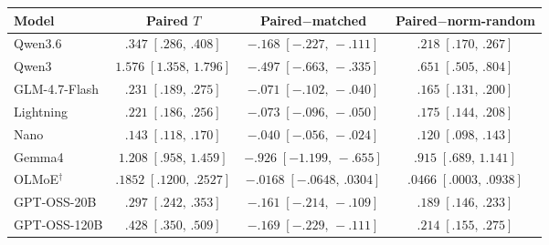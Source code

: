 \begingroup
\fontsize{9}{10.5}\selectfont
\setlength{\tabcolsep}{2.5pt}
\renewcommand{\arraystretch}{1.15}
\begin{tabular*}{\linewidth}{@{\extracolsep{\fill}}lccc@{}}
\toprule
Model & Paired \(T\) & Paired\(-\)matched & Paired\(-\)norm-random \\
\midrule
Qwen3.6 & \(.347\;[.286,\,.408]\) & \(-.168\;[-.227,\,-.111]\) & \(.218\;[.170,\,.267]\)\\[1pt]
Qwen3 & \(1.576\;[1.358,\,1.796]\) & \(-.497\;[-.663,\,-.335]\) & \(.651\;[.505,\,.804]\)\\[1pt]
GLM-4.7-Flash & \(.231\;[.189,\,.275]\) & \(-.071\;[-.102,\,-.040]\) & \(.165\;[.131,\,.200]\)\\[1pt]
Lightning & \(.221\;[.186,\,.256]\) & \(-.073\;[-.096,\,-.050]\) & \(.175\;[.144,\,.208]\)\\[1pt]
Nano & \(.143\;[.118,\,.170]\) & \(-.040\;[-.056,\,-.024]\) & \(.120\;[.098,\,.143]\)\\[1pt]
Gemma4 & \(1.208\;[.958,\,1.459]\) & \(-.926\;[-1.199,\,-.655]\) & \(.915\;[.689,\,1.141]\)\\[1pt]
OLMoE\(^{\dagger}\) & \(.1852\;[.1200,\,.2527]\) & \(-.0168\;[-.0648,\,.0304]\) & \(.0466\;[.0003,\,.0938]\)\\[1pt]
GPT-OSS-20B & \(.297\;[.242,\,.353]\) & \(-.161\;[-.214,\,-.109]\) & \(.189\;[.146,\,.233]\)\\[1pt]
GPT-OSS-120B & \(.428\;[.350,\,.509]\) & \(-.169\;[-.229,\,-.111]\) & \(.214\;[.155,\,.275]\)\\[1pt]
\bottomrule
\end{tabular*}
\endgroup
